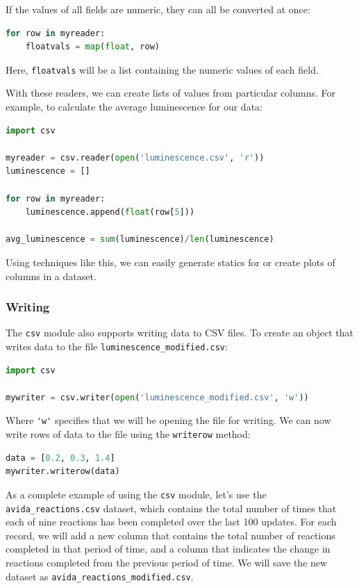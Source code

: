 If the values of all fields are numeric, they can all be converted at
once:

\begin{lstlisting}[language=Python]
for row in myreader:
    floatvals = map(float, row)
\end{lstlisting}
Here, \lstinline!floatvals! will be a list containing the numeric values
of each field.

With these readers, we can create lists of values from particular
columns. For example, to calculate the average luminescence for our
data:

\begin{lstlisting}[language=Python]
import csv

myreader = csv.reader(open('luminescence.csv', 'r'))
luminescence = []

for row in myreader:
    luminescence.append(float(row[5]))

avg_luminescence = sum(luminescence)/len(luminescence)
\end{lstlisting}
Using techniques like this, we can easily generate statics for or create
plots of columns in a dataset.

\subsubsection{Writing}

The \lstinline!csv! module also supports writing data to CSV files. To
create an object that writes data to the file
\lstinline!luminescence_modified.csv!:

\begin{lstlisting}[language=Python]
import csv

mywriter = csv.writer(open('luminescence_modified.csv', 'w'))
\end{lstlisting}
Where \lstinline!'w'! specifies that we will be opening the file for
writing. We can now write rows of data to the file using the
\lstinline!writerow! method:

\begin{lstlisting}[language=Python]
data = [0.2, 0.3, 1.4]
mywriter.writerow(data)
\end{lstlisting}
As a complete example of using the \lstinline!csv! module, let's use the
\lstinline!avida_reactions.csv! dataset, which contains the total number
of times that each of nine reactions has been completed over the last
100 updates. For each record, we will add a new column that contains the
total number of reactions completed in that period of time, and a column
that indicates the change in reactions completed from the previous
period of time. We will save the new dataset as
\lstinline!avida_reactions_modified.csv!.

